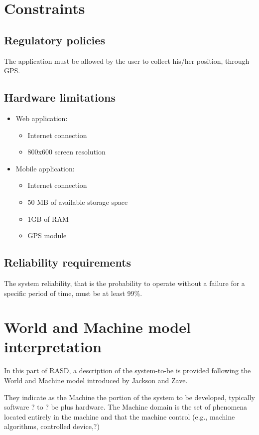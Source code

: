 \documentclass{report}
\begin{document}
	
	\section{Constraints}
	
	
	\subsection{Regulatory policies}
	The application must be allowed by the user to collect his/her position, through GPS.
	
	
	\subsection{Hardware limitations}
	\begin{itemize}
	\item Web application:
		\begin{itemize}
		\item Internet connection
		\item 800x600 screen resolution
		\end{itemize}
	\item Mobile application:
		\begin{itemize}
		\item Internet connection
		\item 50 MB of available storage space
		\item 1GB of RAM
		\item GPS module
		\end{itemize}
	\end{itemize}
	
	
	\subsection{Reliability requirements}
	The system reliability, that is the probability to operate without a failure for a specific period of time, must be at least 99\%.
	
	
	\clearpage
	\section{World and Machine model interpretation}
	In this part of RASD, a description of the system-to-be is provided following the World and Machine model introduced by Jackson and Zave.
	
	\bigskip
	They indicate as the Machine the portion of the system to be developed, typically software ? to ? be plus hardware. The Machine domain is the set of phenomena located entirely in the machine and that the machine control (e.g., machine algorithms, controlled device,?)
	
\end{document}

